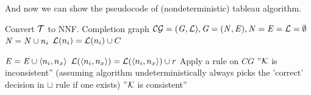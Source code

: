 And now we can show the pseudocode of (nondeterministic) tableau algorithm.

\begin{algorithm}[t!]
    \begin{algorithmic}[1]
			\State Convert $\mathcal{T}$ to NNF.
			\State Completion graph $\mathcal{CG} =(\mathit{G},\mathcal{L}) , \mathit{G}=(\mathit{N},\mathit{E}), \mathit{N} = \mathit{E} = \mathcal{L} =\emptyset$
				\State $\mathit{N} = \mathit{N} \cup n_i$
					\State $\mathcal{L} (n_i) = \mathcal{L} (n_i) \cup C$
				\EndFor
				
					\State $\mathit{E} = \mathit{E} \cup \langle n_i,n_x \rangle$
					\State $\mathcal{L} (\langle n_i,n_x \rangle) = \mathcal{L} (\langle n_i,n_x \rangle)  \cup r$
				\EndFor  
			\EndFor
				\State Apply a rule on $CG$
					\State \Return ''$\mathcal{K}$ is inconsistent''  (assuming algorithm undeterministically always picks the 'correct' decision in $\sqcup$ rule if one exists)
				\EndIf
			\EndWhile
			\State \Return ''$\mathcal{K}$ is consistent''
			\EndFunction

    \end{algorithmic}
\end{algorithm}

